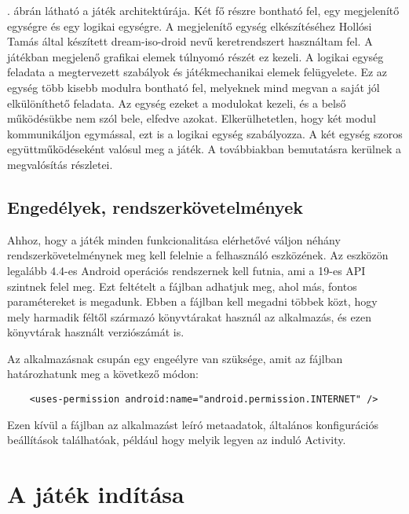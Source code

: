 . ábrán látható a játék architektúrája. 
Két fő részre bontható fel, egy megjelenítő egységre és egy logikai egységre. 
A megjelenítő egység elkészítéséhez Hollósi Tamás által készített dream-iso-droid nevű keretrendszert használtam fel. 
A játékban megjelenő grafikai elemek túlnyomó részét ez kezeli. 
A logikai egység feladata a megtervezett szabályok és játékmechanikai elemek felügyelete. 
Ez az egység több kisebb modulra bontható fel, melyeknek mind megvan a saját jól elkülöníthető feladata. 
Az egység ezeket a modulokat kezeli, és a belső működésükbe nem szól bele, elfedve azokat. 
Elkerülhetetlen, hogy két modul kommunikáljon egymással, ezt is a logikai egység szabályozza. 
A két egység szoros együttműködéseként valósul meg a játék. 
A továbbiakban bemutatásra kerülnek a megvalósítás részletei. 


\subsection*{Engedélyek, rendszerkövetelmények}
\label{requirements}

Ahhoz, hogy a játék minden funkcionalitása elérhetővé váljon néhány rendszerkövetelménynek meg kell felelnie a felhasználó eszközének. 
Az eszközön legalább 4.4-es Android operációs rendszernek kell futnia, ami a 19-es API szintnek felel meg.
Ezt feltételt a  fájlban adhatjuk meg, ahol más, fontos paramétereket is megadunk. 
Ebben a fájlban kell megadni többek közt, hogy mely harmadik féltől származó könyvtárakat használ az alkalmazás, és ezen könyvtárak használt verziószámát is. 

Az alkalmazásnak csupán egy engeélyre van szüksége, amit az  fájlban határozhatunk meg a következő módon:

\begin{lstlisting}
    <uses-permission android:name="android.permission.INTERNET" />
\end{lstlisting}

Ezen kívül a fájlban az alkalmazást leíró metaadatok, általános konfigurációs beállítások találhatóak, például hogy melyik legyen az induló Activity.

\section{A játék indítása}
\label{jatekinditas}

